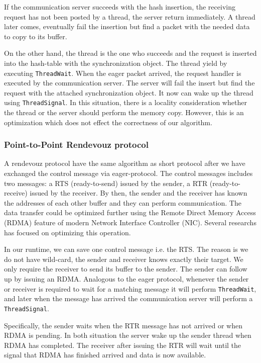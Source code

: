 \documentclass{sig-alternate-05-2015}
\begin{document}
If the communication server succeeds with the hash insertion, the receiving
request has not been posted by a thread, the server return immediately. A
thread later comes, eventually fail the insertion but find a packet
with the needed data to copy to its buffer.

On the other hand, the thread is the one who succeeds and the request is
inserted into the hash-table with the synchronization object. The thread yield
by executing \texttt{ThreadWait}. When the eager packet arrived, the
request handler is executed by the communication server. The server will fail
the insert but find the request with the attached synchronization object. It
now can wake up the thread using \texttt{ThreadSignal}. In this situation,
there is a locality consideration whether the thread or the server should
perform the memory copy. However, this is an optimization which does not effect
the correctness of our algorithm.

\subsubsection{Point-to-Point Rendevouz protocol}
A rendevouz protocol have the same algorithm as short protocol after we have
exchanged the control message via eager-protocol. The control messages 
includes two messages: a RTS (ready-to-send) issued by the sender, a RTR
(ready-to-receive) issued by the receiver. By then, the sender and the receiver
has known the addresses of each other buffer and they can perform
communication.  The data transfer could be optimized further using the
Remote Direct Memory Access (RDMA) feature of modern Network Interface
Controller (NIC).  Several researchs has focused on optimizing this operation.

In our runtime, we can save one control message i.e. the RTS.  The reason is
we do not have wild-card, the sender and receiver knows exactly their target.
We only require the receiver to send its buffer to the sender. The sender can
follow up by issuing an RDMA.  Analogous to the eager protocol, whenever the
sender or receiver is required to wait for a matching message it will perform
\texttt{ThreadWait}, and later when the message has arrived the communication server
will perform a \texttt{ThreadSignal}.

Specifically, the sender waits when the RTR message has not arrived or when
RDMA is pending. In both situation the server wake up the sender thread when
RDMA has completed. The receiver after issuing the RTR will wait until the
signal that RDMA has finished arrived and data is now available.
\end{document}

